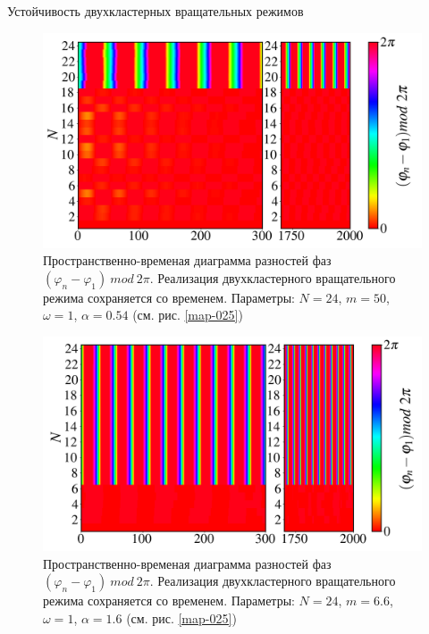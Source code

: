 \begin{chapter}{Устойчивость двухкластерных вращательных режимов}
	\begin{figure}[h!]
		\begin{center}
			\includegraphics[width=1\columnwidth]{pictures/Figure_M_50_A_0.54_O_1.png}
		\end{center}
		\caption{Пространственно-временая диаграмма разностей фаз $(\varphi_n - \varphi_1) \ mod \ 2\pi$.
		Реализация двухкластерного вращательного режима сохраняется со временем.
		Параметры: $N=24$, $m = 50$, $\omega = 1$, $\alpha = 0.54$ (см. рис. \ref{map-025})}
		\label{st-c-3}
	\end{figure}

	\begin{figure}[h!]
		\begin{center}
			\includegraphics[width=1\columnwidth]{pictures/Figure_d.png}
		\end{center}
		\caption{Пространственно-временая диаграмма разностей фаз $(\varphi_n - \varphi_1) \ mod \ 2\pi$.
		Реализация двухкластерного вращательного режима сохраняется со временем.
		Параметры: $N=24$, $m = 6.6$, $\omega = 1$, $\alpha = 1.6$ (см. рис. \ref{map-025})}
		\label{st-c-4}
	\end{figure}



\end{chapter}
